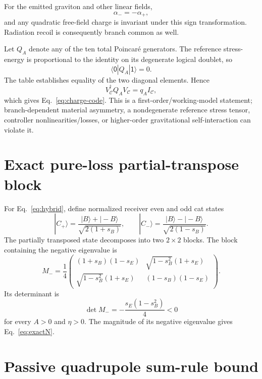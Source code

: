 For the emitted graviton and other linear fields,
\begin{equation}
\alpha_-=-\alpha_+,
\end{equation}
and any quadratic free-field charge is invariant under this sign transformation. Radiation recoil is consequently branch common as well.

Let $Q_A$ denote any of the ten total Poincar\'e generators. The reference stress-energy is proportional to the identity on its degenerate logical doublet, so
\begin{equation}
\langle\mathsf0|Q_A|\mathsf1\rangle=0.
\end{equation}
The table establishes equality of the two diagonal elements. Hence
\begin{equation}
\boxed{
V_{\mathcal C}^\dagger Q_A V_{\mathcal C}=q_A I_{\mathcal C},}
\end{equation}
which gives Eq.~\eqref{eq:charge-code}. This is a first-order/working-model statement; branch-dependent material asymmetry, a nondegenerate reference stress tensor, controller nonlinearities/losses, or higher-order gravitational self-interaction can violate it.

\section{Exact pure-loss partial-transpose block}
\label{app:pureloss}

For Eq.~\eqref{eq:hybrid}, define normalized receiver even and odd cat states
\begin{equation}
|C_+\rangle=\frac{|B\rangle+|-B\rangle}{\sqrt{2(1+s_B)}},
\qquad
|C_-\rangle=\frac{|B\rangle-|-B\rangle}{\sqrt{2(1-s_B)}}.
\end{equation}
The partially transposed state decomposes into two $2\times2$ blocks. The block containing the negative eigenvalue is
\begin{equation}
M_-=
\frac14
\begin{pmatrix}
(1+s_B)(1-s_E) & \sqrt{1-s_B^2}(1+s_E)\\
\sqrt{1-s_B^2}(1+s_E) & (1-s_B)(1-s_E)
\end{pmatrix}.
\end{equation}
Its determinant is
\begin{equation}
\det M_-=-\frac{s_E(1-s_B^2)}{4}<0
\end{equation}
for every $A>0$ and $\eta>0$. The magnitude of its negative eigenvalue gives Eq.~\eqref{eq:exactN}.

\section{Passive quadrupole sum-rule bound}
\label{app:sumrule}

